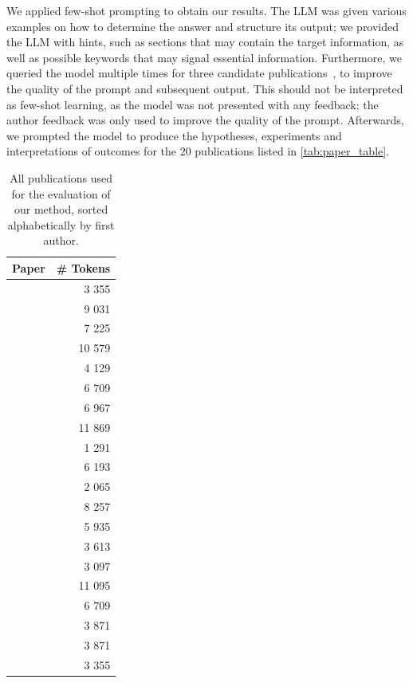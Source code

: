 \documentclass[letterpaper]{article} %
\newcommand{\nbc}[3]{
{\colorbox{#3}{\bfseries\sffamily\scriptsize\textcolor{white}{#1}}}
{\textcolor{#3}{\sf\small$\blacktriangleright$\textit{#2}$\blacktriangleleft$}}
}
\newcommand{\hh}[1]{\nbc{HH}{#1}{red}}
\begin{document}
We applied few-shot prompting to obtain our results. The LLM was given various examples on how to determine the answer and structure its output; we provided the LLM with hints, such as sections that may contain the target information, as well as possible keywords that may signal essential information. 
Furthermore, we queried the model multiple times for three candidate publications~\cite{dettmer2024weighted, Gundersen_Cappelen_Mølnå_Nilsen_2025, snelleman2024edge}, to improve the quality of the prompt and subsequent output. This should not be interpreted as few-shot learning, as the model was not presented with any feedback; the author feedback was only used to improve the quality of the prompt. Afterwards, we prompted the model to produce the hypotheses, experiments and interpretations of outcomes for the $20$ publications listed in \autoref{tab:paper_table}.

\begin{table}
    \centering
    \begin{tabular}{lr}
         Paper & \# Tokens \\
         \hline
         \citet{anastacio2022instance} & 3 355\\
         \citet{benjamins2025carpsframeworkcomparingn} & 9 031\\
         \citet{BerEtAl25} & 7 225\\
         \citet{BosEtAl25} & 10 579\\
         \citet{dettmer2024weighted} & 4 129\\
         \citet{DieEtAl24} & 6 709\\
         \citet{downing2023evolution} & 6 967\\
         \citet{eimer2023hyperparameters} & 11 869\\
         \citet{fehring2025growing} & 1 291\\
         \citet{fleten2024applying} & 6 193\\
         \citet{jankovic2022trajectory} & 2 065\\
         \citet{jekic2025examining} & 8 257\\
         \citet{KauEtAl25} & 5 935\\
         \citet{ParEtAl25} & 3 613\\
         \citet{renting2025towards} & 3 097\\
         \citet{SkaEtAl25} & 11 095\\
         \citet{ShaHoo24} & 6 709\\
         \citet{snelleman2024edge} & 3 871\\
         \citet{toussaint2025edc} & 3 871\\
         \citet{WasEtAl25} & 3 355\\
    \end{tabular}
    \caption{All publications used for the evaluation of our method, sorted alphabetically by first author.}
    \label{tab:paper_table}
\end{table}
\end{document}
